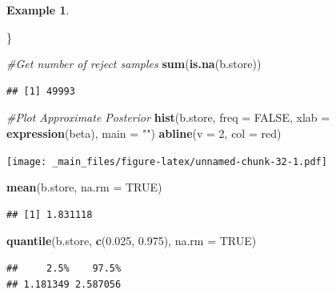 \documentclass[
]{book}
\newenvironment{Shaded}{\begin{snugshade}}{\end{snugshade}}
\newcommand{\AttributeTok}[1]{\textcolor[rgb]{0.13,0.29,0.53}{#1}}
\newcommand{\CommentTok}[1]{\textcolor[rgb]{0.56,0.35,0.01}{\textit{#1}}}
\newcommand{\ConstantTok}[1]{\textcolor[rgb]{0.56,0.35,0.01}{#1}}
\newcommand{\DecValTok}[1]{\textcolor[rgb]{0.00,0.00,0.81}{#1}}
\newcommand{\FloatTok}[1]{\textcolor[rgb]{0.00,0.00,0.81}{#1}}
\newcommand{\FunctionTok}[1]{\textcolor[rgb]{0.13,0.29,0.53}{\textbf{#1}}}
\newcommand{\NormalTok}[1]{#1}
\newcommand{\StringTok}[1]{\textcolor[rgb]{0.31,0.60,0.02}{#1}}
\theoremstyle{definition}
\theoremstyle{definition}
\newtheorem{example}{Example}[chapter]
\theoremstyle{definition}
\theoremstyle{definition}
\theoremstyle{remark}
\begin{document}
\begin{example}
\begin{Shaded}
\begin{Highlighting}[]
\NormalTok{\}}

\CommentTok{\#Get number of reject samples}
\FunctionTok{sum}\NormalTok{(}\FunctionTok{is.na}\NormalTok{(b.store))}
\end{Highlighting}
\end{Shaded}

\begin{verbatim}
## [1] 49993
\end{verbatim}

\begin{Shaded}
\begin{Highlighting}[]
\CommentTok{\#Plot Approximate Posterior}
\FunctionTok{hist}\NormalTok{(b.store, }\AttributeTok{freq =} \ConstantTok{FALSE}\NormalTok{, }\AttributeTok{xlab =} \FunctionTok{expression}\NormalTok{(beta), }\AttributeTok{main =} \StringTok{""}\NormalTok{)}
\FunctionTok{abline}\NormalTok{(}\AttributeTok{v =} \DecValTok{2}\NormalTok{, }\AttributeTok{col =} \StringTok{\textquotesingle{}red\textquotesingle{}}\NormalTok{)}
\end{Highlighting}
\end{Shaded}

\texttt{[image: \_main\_files/figure-latex/unnamed-chunk-32-1.pdf]}

\begin{Shaded}
\begin{Highlighting}[]
\FunctionTok{mean}\NormalTok{(b.store, }\AttributeTok{na.rm =} \ConstantTok{TRUE}\NormalTok{)}
\end{Highlighting}
\end{Shaded}

\begin{verbatim}
## [1] 1.831118
\end{verbatim}

\begin{Shaded}
\begin{Highlighting}[]
\FunctionTok{quantile}\NormalTok{(b.store, }\FunctionTok{c}\NormalTok{(}\FloatTok{0.025}\NormalTok{, }\FloatTok{0.975}\NormalTok{), }\AttributeTok{na.rm =} \ConstantTok{TRUE}\NormalTok{)}
\end{Highlighting}
\end{Shaded}

\begin{verbatim}
##     2.5%    97.5% 
## 1.181349 2.587056
\end{verbatim}

\end{example}
\end{document}
